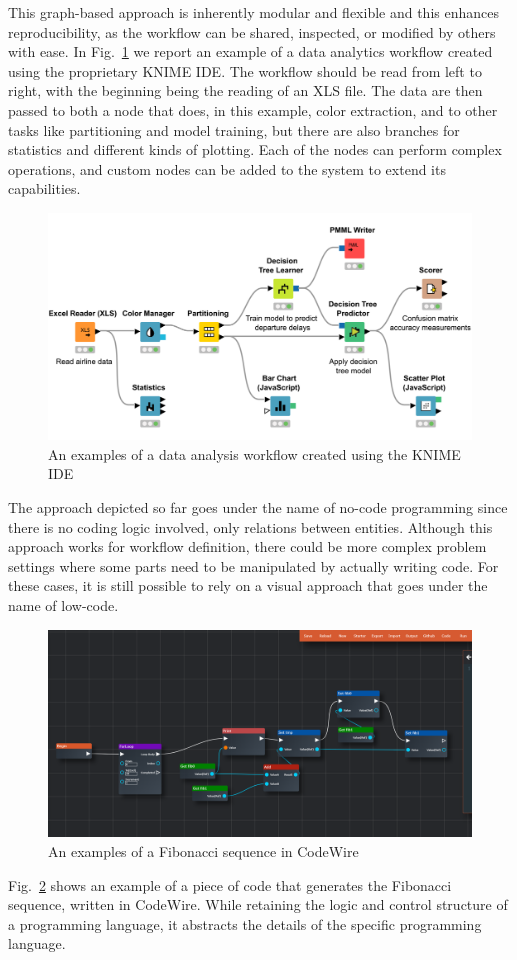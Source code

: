 \documentclass[a4paper,12pt]{article}
\begin{document}
This graph-based approach is inherently modular and flexible and this enhances reproducibility, as the workflow can be shared, inspected, or modified by others with ease.
In Fig.~\ref{nocode-data} we report an example of a data analytics workflow created using the proprietary KNIME IDE. The workflow should be read from left to right, with the beginning being the reading of an XLS file. The data are then passed to both a node that does, in this example, color extraction, and to other tasks like partitioning and model training, but there are also branches for statistics and different kinds of plotting. Each of the nodes can perform complex operations, and custom nodes can be added to the system to extend its capabilities. 
\begin{figure}
\includegraphics[width=400pt]{nocode-data.png}
\caption{An examples of a data analysis workflow created using the KNIME IDE}
\label{nocode-data}
\end{figure}

The approach depicted so far goes under the name of no-code programming since there is no coding logic involved, only relations between entities. Although this approach works for workflow definition, there could be more complex problem settings where some parts need to be manipulated by actually writing code. For these cases, it is still possible to rely on a visual approach that goes under the name of low-code. 
\begin{figure}
\includegraphics[width=400pt]{lowcode.png}
\caption{An examples of a Fibonacci sequence in CodeWire}
\label{lowcode}
\end{figure}
Fig.~\ref{lowcode} shows an example of a piece of code that generates the Fibonacci sequence, written in CodeWire. While retaining the logic and control structure of a programming language, it abstracts the details of the specific programming language. 
\end{document}
